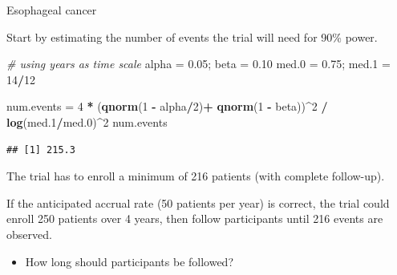 \documentclass[ignorenonframetext,]{beamer}
\newenvironment{Shaded}{\begin{snugshade}}{\end{snugshade}}
\newcommand{\CommentTok}[1]{\textcolor[rgb]{0.56,0.35,0.01}{\textit{#1}}}
\newcommand{\DecValTok}[1]{\textcolor[rgb]{0.00,0.00,0.81}{#1}}
\newcommand{\FloatTok}[1]{\textcolor[rgb]{0.00,0.00,0.81}{#1}}
\newcommand{\KeywordTok}[1]{\textcolor[rgb]{0.13,0.29,0.53}{\textbf{#1}}}
\newcommand{\NormalTok}[1]{#1}
\newcommand{\OperatorTok}[1]{\textcolor[rgb]{0.81,0.36,0.00}{\textbf{#1}}}
\newcommand{\StringTok}[1]{\textcolor[rgb]{0.31,0.60,0.02}{#1}}
\providecommand{\tightlist}{%
  \setlength{\itemsep}{0pt}\setlength{\parskip}{0pt}}
\begin{document}
\begin{frame}[fragile]{%
\protect\hypertarget{esophageal-cancer}{%
Esophageal cancer}}

\small

Start by estimating the number of events the trial will need for 90\%
power.

\footnotesize

\begin{Shaded}
\begin{Highlighting}[]
\CommentTok{# using years as time scale}
\NormalTok{alpha =}\StringTok{ }\FloatTok{0.05}\NormalTok{; beta =}\StringTok{ }\FloatTok{0.10}
\NormalTok{med}\FloatTok{.0}\NormalTok{ =}\StringTok{ }\FloatTok{0.75}\NormalTok{; med}\FloatTok{.1}\NormalTok{ =}\StringTok{ }\DecValTok{14}\OperatorTok{/}\DecValTok{12}

\NormalTok{num.events =}\StringTok{ }\DecValTok{4} \OperatorTok{*}\StringTok{ }\NormalTok{(}\KeywordTok{qnorm}\NormalTok{(}\DecValTok{1} \OperatorTok{-}\StringTok{ }\NormalTok{alpha}\OperatorTok{/}\DecValTok{2}\NormalTok{)}\OperatorTok{+}\StringTok{ }\KeywordTok{qnorm}\NormalTok{(}\DecValTok{1} \OperatorTok{-}\StringTok{ }\NormalTok{beta))}\OperatorTok{^}\DecValTok{2} \OperatorTok{/}
\StringTok{  }\KeywordTok{log}\NormalTok{(med}\FloatTok{.1}\OperatorTok{/}\NormalTok{med}\FloatTok{.0}\NormalTok{)}\OperatorTok{^}\DecValTok{2}
\NormalTok{num.events}
\end{Highlighting}
\end{Shaded}

\begin{verbatim}
## [1] 215.3
\end{verbatim}

\small

The trial has to enroll a minimum of 216 patients (with complete
follow-up).

If the anticipated accrual rate (50 patients per year) is correct, the
trial could enroll 250 patients over 4 years, then follow participants
until 216 events are observed.

\begin{itemize}
\tightlist
\item
  How long should participants be followed?
\end{itemize}

\end{frame}
\end{document}
